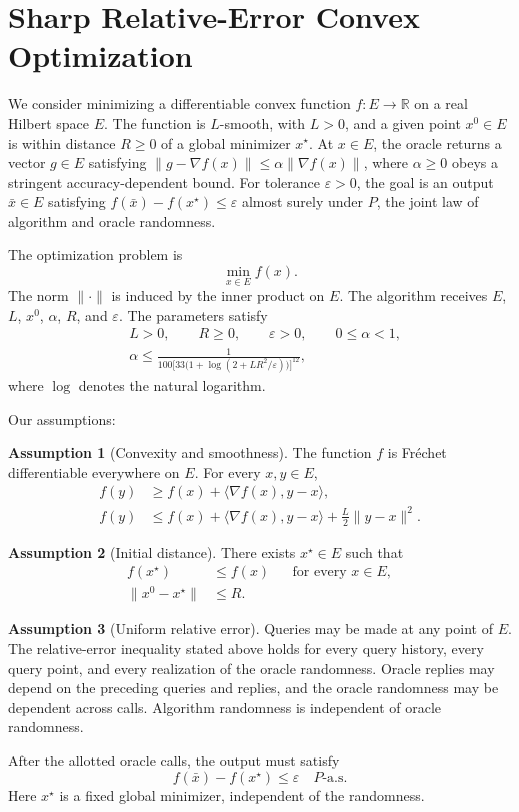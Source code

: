 \documentclass[10pt]{article}
\theoremstyle{definition}
\newtheorem{assumption}{Assumption}
\begin{document}
\section*{Sharp Relative-Error Convex Optimization}
We consider minimizing a differentiable convex function $f:E\to\mathbb{R}$ on a real Hilbert space $E$. The function is $L$-smooth, with $L>0$, and a given point $x^0\in E$ is within distance $R\geq0$ of a global minimizer $x^\star$. At $x\in E$, the oracle returns a vector $g\in E$ satisfying $\|g-\nabla f(x)\|\leq\alpha\|\nabla f(x)\|$, where $\alpha\geq0$ obeys a stringent accuracy-dependent bound. For tolerance $\varepsilon>0$, the goal is an output $\bar{x}\in E$ satisfying $f(\bar{x})-f(x^\star)\leq\varepsilon$ almost surely under $P$, the joint law of algorithm and oracle randomness.

The optimization problem is
\[
\min_{x\in E} f(x).
\]
The norm $\|\cdot\|$ is induced by the inner product on $E$. The algorithm receives $E$, $L$, $x^0$, $\alpha$, $R$, and $\varepsilon$. The parameters satisfy
\[
\begin{aligned}
&L>0,\qquad R\geq0,\qquad \varepsilon>0,\qquad 0\leq\alpha<1,\\
&\alpha\leq
\frac{1}{100\bigl[33\bigl(1+\log(2+LR^2/\varepsilon)\bigr)\bigr]^{12}},
\end{aligned}
\]
where $\log$ denotes the natural logarithm.

Our assumptions:
\begin{assumption}[Convexity and smoothness]
The function $f$ is Fr\'echet differentiable everywhere on $E$. For every $x,y\in E$,
\[
\begin{aligned}
f(y)&\geq f(x)+\langle\nabla f(x),y-x\rangle,\\
f(y)&\leq f(x)+\langle\nabla f(x),y-x\rangle
       +\frac{L}{2}\|y-x\|^2.
\end{aligned}
\]
\end{assumption}

\begin{assumption}[Initial distance]
There exists $x^\star\in E$ such that
\[
\begin{aligned}
f(x^\star)&\leq f(x) &&\text{for every }x\in E,\\
\|x^0-x^\star\|&\leq R.
\end{aligned}
\]
\end{assumption}

\begin{assumption}[Uniform relative error]
Queries may be made at any point of $E$. The relative-error inequality stated above holds for every query history, every query point, and every realization of the oracle randomness. Oracle replies may depend on the preceding queries and replies, and the oracle randomness may be dependent across calls. Algorithm randomness is independent of oracle randomness.
\end{assumption}

After the allotted oracle calls, the output must satisfy
\[
f(\bar{x})-f(x^\star)\leq\varepsilon
\quad P\text{-a.s.}
\]
Here $x^\star$ is a fixed global minimizer, independent of the randomness.
\end{document}
